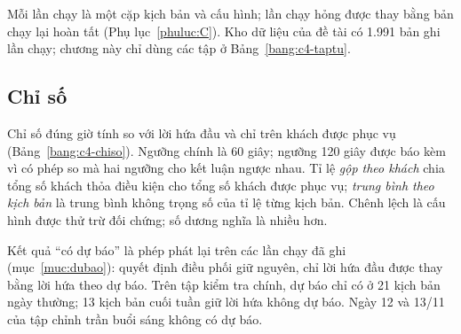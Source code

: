 Mỗi lần chạy là một cặp kịch bản và cấu hình; lần chạy hỏng được thay bằng bản chạy lại hoàn tất
(Phụ lục~\ref{phuluc:C}). Kho dữ liệu của đề tài có 1.991 bản ghi lần chạy; chương này chỉ dùng các tập ở
Bảng~\ref{bang:c4-taptu}.

\subsection{Chỉ số}
\label{muc:c4-chiso}

Chỉ số đúng giờ tính so với lời hứa đầu và chỉ trên khách được phục vụ (Bảng~\ref{bang:c4-chiso}).
Ngưỡng chính là 60 giây; ngưỡng 120 giây được báo kèm vì có phép so mà hai ngưỡng cho kết luận ngược
nhau. Tỉ lệ \emph{gộp theo khách} chia tổng số khách thỏa điều kiện cho tổng số khách được phục vụ;
\emph{trung bình theo kịch bản} là trung bình không trọng số của tỉ lệ từng kịch bản. Chênh lệch là cấu
hình được thử trừ đối chứng; số dương nghĩa là nhiều hơn.

Kết quả ``có dự báo'' là phép phát lại trên các lần chạy đã ghi (mục~\ref{muc:dubao}): quyết định điều
phối giữ nguyên, chỉ lời hứa đầu được thay bằng lời hứa theo dự báo. Trên tập kiểm tra chính, dự báo chỉ
có ở 21 kịch bản ngày thường; 13 kịch bản cuối tuần giữ lời hứa không dự báo. Ngày 12 và 13/11 của tập
chỉnh trần buổi sáng không có dự báo.


